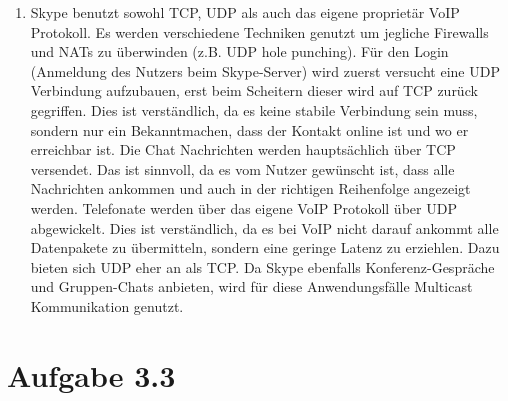 \documentclass[german,12pt,a4paper]{article}
\begin{document}
\begin{enumerate}
	\item Skype benutzt sowohl TCP, UDP als auch das eigene proprietär VoIP Protokoll. Es werden
		verschiedene Techniken genutzt um jegliche Firewalls und NATs zu überwinden (z.B. UDP hole
		punching). Für den Login (Anmeldung des Nutzers beim Skype-Server) wird zuerst versucht eine UDP
		Verbindung aufzubauen, erst beim Scheitern dieser wird auf TCP zurück gegriffen. Dies ist
		verständlich, da es keine stabile Verbindung sein muss, sondern nur ein Bekanntmachen, dass der
		Kontakt online ist und wo er erreichbar ist. Die Chat Nachrichten werden hauptsächlich über TCP
		versendet. Das ist sinnvoll, da es vom Nutzer gewünscht ist, dass alle Nachrichten ankommen und
		auch in der richtigen Reihenfolge angezeigt werden. Telefonate werden über das eigene VoIP
		Protokoll über UDP abgewickelt. Dies ist verständlich, da es bei VoIP nicht darauf ankommt alle
		Datenpakete zu übermitteln, sondern eine geringe Latenz zu erziehlen.  Dazu bieten sich UDP eher
		an als TCP. Da Skype ebenfalls Konferenz-Gespräche und Gruppen-Chats anbieten, wird für diese
		Anwendungsfälle Multicast Kommunikation genutzt.
	
\end{enumerate}

\section*{Aufgabe 3.3}
\end{document}
